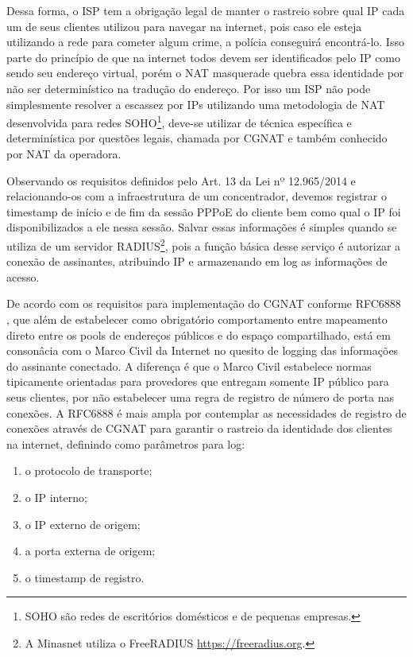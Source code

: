    Dessa forma, o ISP tem a obrigação legal de manter o rastreio sobre qual IP cada um de seus clientes utilizou para navegar na internet, pois caso ele esteja utilizando a rede para cometer algum crime, a polícia conseguirá encontrá-lo. Isso parte do princípio de que na internet todos devem ser identificados pelo IP como sendo seu endereço virtual, porém o NAT masquerade quebra essa identidade por não ser determinístico na tradução do endereço. Por isso um ISP não pode simplesmente resolver a escassez por IPs utilizando uma metodologia de NAT desenvolvida para redes SOHO\footnote{SOHO são redes de escritórios domésticos e de pequenas empresas.}, deve-se utilizar de técnica específica e determinística por questões legais, chamada por CGNAT e também conhecido por NAT da operadora.
   
   Observando os requisitos definidos pelo Art. 13 da Lei nº 12.965/2014 e relacionando-os com a infraestrutura de um concentrador, devemos registrar o timestamp de início e de fim da sessão PPPoE do cliente bem como qual o IP foi disponibilizados a ele nessa sessão. Salvar essas informações é simples quando se utiliza de um servidor RADIUS\footnote{A Minasnet utiliza o FreeRADIUS \url{https://freeradius.org}.}, pois a função básica desse serviço é autorizar a conexão de assinantes, atribuindo IP e armazenando em log as informações de acesso.

   De acordo com os requisitos para implementação do CGNAT conforme RFC6888 \cite{rfc6888}, que além de estabelecer como obrigatório comportamento entre mapeamento direto entre os pools de endereços públicos e do espaço compartilhado, está em consonâcia com o Marco Civil da Internet no quesito de logging das informações do assinante conectado. A diferença é que o Marco Civil estabelece normas tipicamente orientadas para provedores que entregam somente IP público para seus clientes, por não estabelecer uma regra de registro de número de porta nas conexões. A RFC6888 é mais ampla por contemplar as necessidades de registro de conexões através de CGNAT para garantir o rastreio da identidade dos clientes na internet, definindo como parâmetros para log:
   
   \begin{enumerate}[label=\alph*)]
       \item o protocolo de transporte;
       \item o IP interno;
       \item o IP externo de origem;
       \item a porta externa de origem;
       \item o timestamp de registro.
   \end{enumerate}

